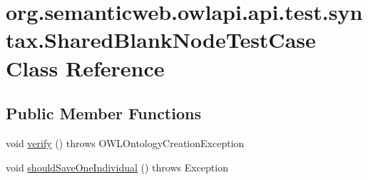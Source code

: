 \hypertarget{classorg_1_1semanticweb_1_1owlapi_1_1api_1_1test_1_1syntax_1_1_shared_blank_node_test_case}{\section{org.\-semanticweb.\-owlapi.\-api.\-test.\-syntax.\-Shared\-Blank\-Node\-Test\-Case Class Reference}
\label{classorg_1_1semanticweb_1_1owlapi_1_1api_1_1test_1_1syntax_1_1_shared_blank_node_test_case}
}
\subsection*{Public Member Functions}
\begin{DoxyCompactItemize}
\item 
void \hyperlink{classorg_1_1semanticweb_1_1owlapi_1_1api_1_1test_1_1syntax_1_1_shared_blank_node_test_case_a416bc672f0f8e84c48fb38c6ec10d69e}{verify} ()  throws O\-W\-L\-Ontology\-Creation\-Exception 
\item 
void \hyperlink{classorg_1_1semanticweb_1_1owlapi_1_1api_1_1test_1_1syntax_1_1_shared_blank_node_test_case_ae110b15fef09994ebc8df096eef280a7}{should\-Save\-One\-Individual} ()  throws Exception 
\end{DoxyCompactItemize}
